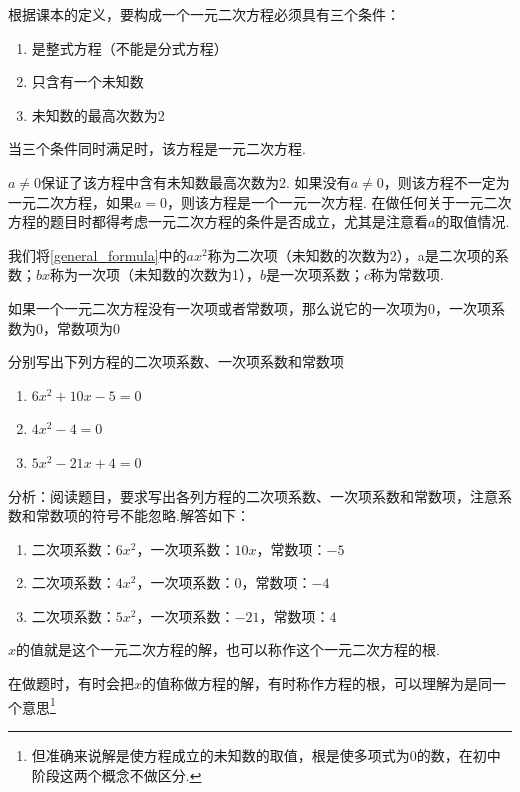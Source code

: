 \documentclass[lang=cn, 10pt, titlestyle=display, oneside]{elegantbook}
\begin{document}
根据课本的定义，要构成一个一元二次方程必须具有三个条件：
\begin{enumerate}
    \item 是整式方程（不能是分式方程）
    \item 只含有一个未知数
    \item 未知数的最高次数为2
\end{enumerate}
\par
当三个条件同时满足时，该方程是一元二次方程.\\
\begin{remark}
    \(a\ne 0\)保证了该方程中含有未知数最高次数为2. 如果没有\(a\ne 0\)，则该方程不一定为一元二次方程，如果\(a= 0\)，则该方程是一个一元一次方程. 在做任何关于一元二次方程的题目时都得考虑一元二次方程的条件是否成立，尤其是注意看\(a\)的取值情况.
\end{remark}
\par
我们将\eqref{general_formula}中的$ax^2$称为二次项（未知数的次数为2），a是二次项的系数；$bx$称为一次项（未知数的次数为1），$b$是一次项系数；$c$称为常数项.
\par
\begin{remark}
    如果一个一元二次方程没有一次项或者常数项，那么说它的一次项为0，一次项系数为0，常数项为0
\end{remark}
\begin{example}
    分别写出下列方程的二次项系数、一次项系数和常数项
    \begin{enumerate}
        \item \( 6x^2+10x-5=0 \)
        \item \( 4x^2-4=0 \)
        \item \( 5x^2-21x+4=0 \)
    \end{enumerate}
\end{example}
\par
\begin{solution}
    分析：阅读题目，要求写出各列方程的二次项系数、一次项系数和常数项，注意系数和常数项的符号不能忽略.解答如下：
    \begin{enumerate}
        \item  二次项系数：\(6x^2\)，一次项系数：\(10x\)，常数项：\(-5\)
        \item  二次项系数：\(4x^2\)，一次项系数：\(0\)，常数项：\(-4\)
        \item  二次项系数：\(5x^2\)，一次项系数：\(-21\)，常数项：\(4\)
    \end{enumerate}
\end{solution}
$x$的值就是这个一元二次方程的解，也可以称作这个一元二次方程的根.
\begin{remark}
    在做题时，有时会把$x$的值称做方程的解，有时称作方程的根，可以理解为是同一个意思\footnote{但准确来说解是使方程成立的未知数的取值，根是使多项式为0的数，在初中阶段这两个概念不做区分.}
\end{remark}
\end{document}
